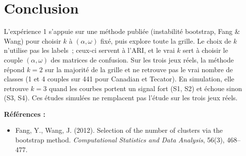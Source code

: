 \documentclass[11pt, a4paper]{article}
\begin{document}
\section{Conclusion}

L'expérience 1 s'appuie sur une méthode publiée (instabilité bootstrap, Fang \&
Wang) pour choisir $k$ à $(\alpha,\omega)$ fixé, puis explore toute la grille.
Le choix de $k$ n'utilise pas les labels~; ceux-ci servent à l'ARI, et le vrai $k$
sert à choisir le couple $(\alpha,\omega)$ des matrices de confusion. Sur les
trois jeux réels, la méthode répond $k=2$ sur la majorité de la grille et ne
retrouve pas le vrai nombre de classes (1 et 4 couples sur 441 pour Canadian et
Tecator). En simulation, elle retrouve $k=3$ quand les courbes portent un signal
fort (S1, S2) et échoue sinon (S3, S4). Ces études simulées ne remplacent pas
l'étude sur les trois jeux réels.

\vspace{1em}
\noindent\textbf{Références :}
\begin{itemize}
  \item Fang, Y., Wang, J. (2012). Selection of the number of clusters via the
    bootstrap method. \textit{Computational Statistics and Data Analysis}, 56(3),
    468--477.
\end{itemize}
\end{document}
